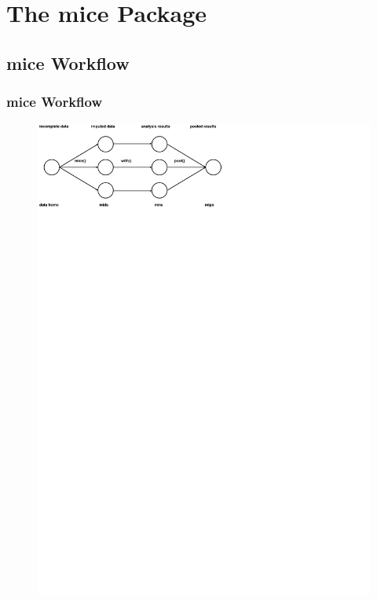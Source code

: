 \documentclass[UKenglish
  pdftex                    %
  dvipsnames                %
]{beamer}
\newcommand{\pk}[1]{\textcolor{Rblue}{\textsf{#1}}}
\begin{document}
\section{The \pk{mice} Package}

\subsection{\pk{mice} Workflow}
\begin{frame}\frametitle{\pk{mice} Workflow \small\parencite{vanbuuren:2011}}

\begin{figure}
  \centering
  \includegraphics[width=\textwidth]{./Figures/workflow.pdf}
\end{figure}

\end{frame}
\end{document}
